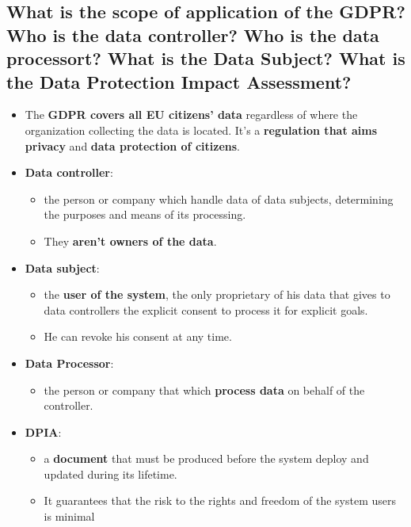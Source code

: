 \documentclass[9pt, letterpaper]{article}
\begin{document}
\subsection{What is the scope of application of the GDPR? Who is the data controller? Who is the data processort? What is the Data Subject? What is the Data Protection Impact Assessment?}
\begin{itemize}
	\item The \textbf{GDPR covers all EU citizens' data} regardless of where the organization collecting the data is located. It's a \textbf{regulation that aims privacy} and \textbf{data protection of citizens}.
	\item \textbf{Data controller}:
	\begin{itemize}
		\item the person or company which handle data of data subjects, determining the purposes and means of its processing.
		\item They \textbf{aren't owners of the data}.
	\end{itemize}		
	\item \textbf{Data subject}: 
	\begin{itemize}
		\item the \textbf{user of the system}, the only proprietary of his data that gives to data controllers the explicit consent to process it for explicit goals.
		\item He can revoke his consent at any time.
	\end{itemize}	
	\item \textbf{Data Processor}: 
	\begin{itemize}
		\item the person or company that which \textbf{process data} on behalf of the controller.
	\end{itemize}	
	\item \textbf{DPIA}: 
	\begin{itemize}
		\item a \textbf{document} that must be produced before the system deploy and updated during its lifetime.
		\item It guarantees that the risk to the rights and freedom of the system users is minimal
	\end{itemize}
\end{itemize}
\end{document}
